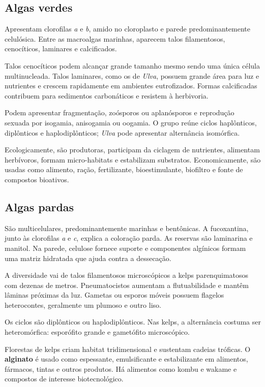 \documentclass[12pt,a4paper]{article}
\begin{document}
\subsection{Algas verdes}
Apresentam clorofilas \textit{a} e \textit{b}, amido no cloroplasto e parede
predominantemente celulósica. Entre as macroalgas marinhas, aparecem talos
filamentosos, cenocíticos, laminares e calcificados.

Talos cenocíticos podem alcançar grande tamanho mesmo sendo uma única célula
multinucleada. Talos laminares, como os de \textit{Ulva}, possuem grande área
para luz e nutrientes e crescem rapidamente em ambientes eutrofizados. Formas
calcificadas contribuem para sedimentos carbonáticos e resistem à herbivoria.

Podem apresentar fragmentação, zoósporos ou aplanósporos e reprodução sexuada
por isogamia, anisogamia ou oogamia. O grupo reúne ciclos haplônticos,
diplônticos e haplodiplônticos; \textit{Ulva} pode apresentar alternância
isomórfica.

Ecologicamente, são produtoras, participam da ciclagem de nutrientes, alimentam
herbívoros, formam micro-habitats e estabilizam substratos. Economicamente, são
usadas como alimento, ração, fertilizante, bioestimulante, biofiltro e fonte de
compostos bioativos.

\subsection{Algas pardas}
São multicelulares, predominantemente marinhas e bentônicas. A fucoxantina,
junto às clorofilas \textit{a} e \textit{c}, explica a coloração parda. As
reservas são laminarina e manitol. Na parede, celulose fornece suporte e
componentes algínicos formam uma matriz hidratada que ajuda contra a dessecação.

A diversidade vai de talos filamentosos microscópicos a kelps parenquimatosos
com dezenas de metros. Pneumatocistos aumentam a flutuabilidade e mantêm lâminas
próximas da luz. Gametas ou esporos móveis possuem flagelos heterocontes,
geralmente um plumoso e outro liso.

Os ciclos são diplônticos ou haplodiplônticos. Nas kelps, a alternância costuma
ser heteromórfica: esporófito grande e gametófito microscópico.

Florestas de kelps criam habitat tridimensional e sustentam cadeias tróficas. O
\textbf{alginato} é usado como espessante, emulsificante e estabilizante em
alimentos, fármacos, tintas e outros produtos. Há alimentos como kombu e wakame
e compostos de interesse biotecnológico.
\end{document}
